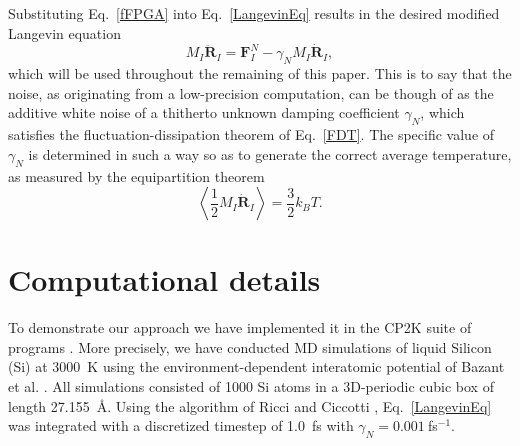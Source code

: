\documentclass[format=acmsmall,review,timestamp,urlbreakonhyphens]{acmart}
\begin{document}
Substituting Eq.~\ref{fFPGA} into Eq.~\ref{LangevinEq} results in the desired modified Langevin equation
\begin{equation} \label{modLangevin}
M_{I}\ddot{\textbf{R}}_{I} = \textbf{F}_{I}^{N}-\gamma _{N}M_{I}\dot{\textbf{R}}_{I},
\end{equation}
which will be used throughout the remaining of this paper. This is to say that the noise, as originating from a low-precision computation, can be though of as the additive white noise of a thitherto unknown damping coefficient $\gamma_N$, which satisfies the fluctuation-dissipation theorem of Eq.~\ref{FDT}.  The specific value of $\gamma_N$ is determined in such a way so as to generate the correct average temperature, as measured by the equipartition theorem
\begin{equation}
\left\langle \frac{1}{2} M_I \dot{\textbf{R}}_{I} \right\rangle = \frac{3}{2} k_B T.
\label{EquiPartTheorem}
\end{equation}




\section{Computational details}
\label{sec:computational}
To demonstrate our approach we have implemented it in the CP2K suite of programs \cite{cp2k}. More precisely, we have conducted MD simulations of liquid Silicon (Si) at 3000~K using the environment-dependent interatomic potential of Bazant et al. \cite{EIP1,EIP2}.
All simulations consisted of 1000 Si atoms in a 3D-periodic cubic box of length 27.155~\AA. Using the algorithm of Ricci and Ciccotti \cite{Ricci}, Eq.~\ref{LangevinEq} was integrated with a discretized timestep of 1.0~fs with $\gamma_N = 0.001~$fs$^{-1}$.
\end{document}
